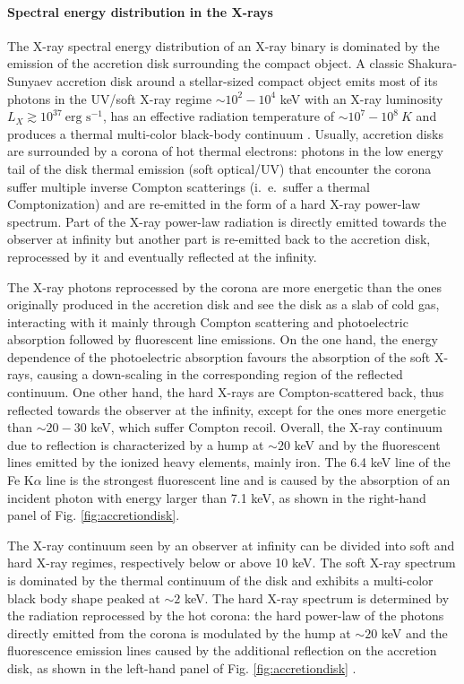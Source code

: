 \documentclass[a4paper,titlepage]{book}     	%
\begin{document}
\paragraph{Spectral energy distribution in the X-rays}
The X-ray spectral energy distribution of an X-ray binary is dominated by the emission of the accretion disk surrounding the compact object. A classic Shakura-Sunyaev accretion disk around a stellar-sized compact object emits most of its photons in the UV/soft X-ray regime $\sim 10^{2}-10^{4}$ keV with an X-ray luminosity $L_X \gtrsim 10^{37}~\text{erg s}^{-1}$, has an effective radiation temperature of $\sim 10^{7}-10^{8}~K$ and produces a thermal multi-color black-body continuum \cite{S&S1973_accretiondisk}. Usually, accretion disks are surrounded by a corona of hot thermal electrons: photons in the low energy tail of the disk thermal emission (soft optical/UV) that encounter the corona suffer multiple inverse Compton scatterings (i.\ e.\ suffer a thermal Comptonization) and are re-emitted in the form of a hard X-ray power-law spectrum. Part of the X-ray power-law radiation is directly emitted towards the observer at infinity but another part is re-emitted back to the accretion disk, reprocessed by it and eventually reflected at the infinity. 
 
The X-ray photons reprocessed by the corona are more energetic than the ones originally produced in the accretion disk and see the disk as a slab of cold gas, interacting with it mainly through Compton scattering and photoelectric absorption followed by fluorescent line emissions. On the one hand, the energy dependence of the photoelectric absorption favours the absorption of the soft X-rays, causing a down-scaling in the corresponding region of the reflected continuum. One other hand, the hard X-rays are Compton-scattered back, thus reflected towards the observer at the infinity, except for the ones more energetic than $\sim 20-30$ keV, which suffer Compton recoil. Overall, the X-ray continuum due to reflection is characterized by a hump at $\sim 20$ keV and by the fluorescent lines emitted by the ionized heavy elements, mainly iron. The 6.4 keV line of the Fe K$\alpha$ line is the strongest fluorescent line and is caused by the absorption of an incident photon with energy larger than 7.1 keV, as shown in the right-hand panel of Fig. \ref{fig:accretiondisk}.

The X-ray continuum seen by an observer at infinity can be divided into soft and hard X-ray regimes, respectively below or above 10 keV. The soft X-ray spectrum is dominated by the thermal continuum of the disk and exhibits a multi-color black body shape peaked at $\sim 2$ keV. The hard X-ray spectrum is determined by the radiation reprocessed by the hot corona: the hard power-law of the photons directly emitted from the corona is modulated by the hump at $\sim 20$ keV and the fluorescence emission lines caused by the additional reflection on the accretion disk, as shown in the left-hand panel of Fig. \ref{fig:accretiondisk} \cite{FeKalphaline_Fabian2000}.
\end{document}
